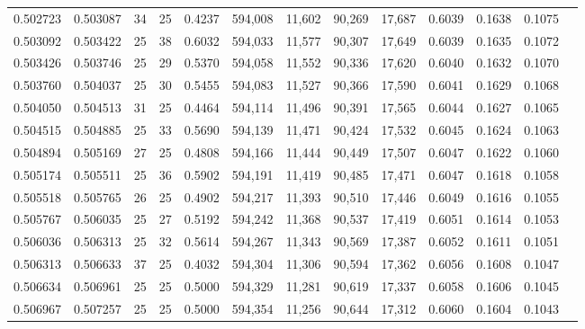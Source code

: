 \begin{tabular}{rrrrrrrrrrrrr}
0.502723 & 0.503087 &    34 &  25 &                                     0.4237 & 594,008 &  11,602 &  90,269 &  17,687 & 0.6039 & 0.1638 & 0.1075 \\
0.503092 & 0.503422 &    25 &  38 &                                     0.6032 & 594,033 &  11,577 &  90,307 &  17,649 & 0.6039 & 0.1635 & 0.1072 \\
0.503426 & 0.503746 &    25 &  29 &                                     0.5370 & 594,058 &  11,552 &  90,336 &  17,620 & 0.6040 & 0.1632 & 0.1070 \\
0.503760 & 0.504037 &    25 &  30 &                                     0.5455 & 594,083 &  11,527 &  90,366 &  17,590 & 0.6041 & 0.1629 & 0.1068 \\
0.504050 & 0.504513 &    31 &  25 &                                     0.4464 & 594,114 &  11,496 &  90,391 &  17,565 & 0.6044 & 0.1627 & 0.1065 \\
0.504515 & 0.504885 &    25 &  33 &                                     0.5690 & 594,139 &  11,471 &  90,424 &  17,532 & 0.6045 & 0.1624 & 0.1063 \\
0.504894 & 0.505169 &    27 &  25 &                                     0.4808 & 594,166 &  11,444 &  90,449 &  17,507 & 0.6047 & 0.1622 & 0.1060 \\
0.505174 & 0.505511 &    25 &  36 &                                     0.5902 & 594,191 &  11,419 &  90,485 &  17,471 & 0.6047 & 0.1618 & 0.1058 \\
0.505518 & 0.505765 &    26 &  25 &                                     0.4902 & 594,217 &  11,393 &  90,510 &  17,446 & 0.6049 & 0.1616 & 0.1055 \\
0.505767 & 0.506035 &    25 &  27 &                                     0.5192 & 594,242 &  11,368 &  90,537 &  17,419 & 0.6051 & 0.1614 & 0.1053 \\
0.506036 & 0.506313 &    25 &  32 &                                     0.5614 & 594,267 &  11,343 &  90,569 &  17,387 & 0.6052 & 0.1611 & 0.1051 \\
0.506313 & 0.506633 &    37 &  25 &                                     0.4032 & 594,304 &  11,306 &  90,594 &  17,362 & 0.6056 & 0.1608 & 0.1047 \\
0.506634 & 0.506961 &    25 &  25 &                                     0.5000 & 594,329 &  11,281 &  90,619 &  17,337 & 0.6058 & 0.1606 & 0.1045 \\
0.506967 & 0.507257 &    25 &  25 &                                     0.5000 & 594,354 &  11,256 &  90,644 &  17,312 & 0.6060 & 0.1604 & 0.1043 \\

\end{tabular}
